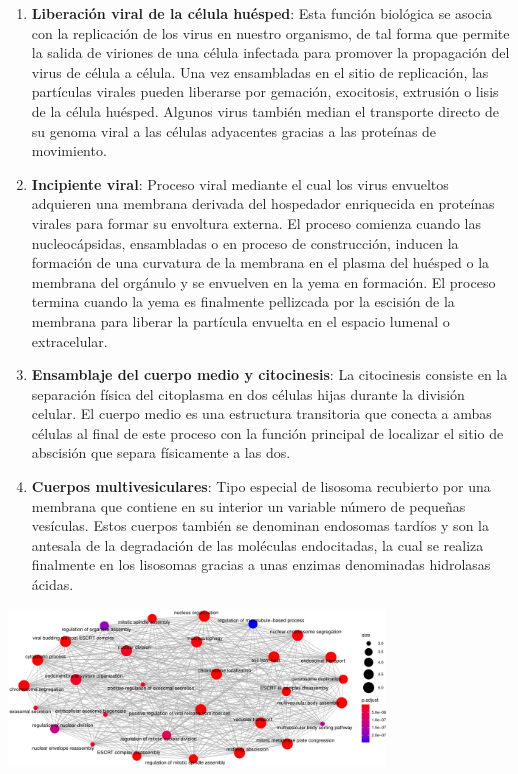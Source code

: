 \begin{enumerate}
    \item \textbf{Liberación viral de la célula huésped}: Esta función biológica se asocia con la replicación de los virus en nuestro organismo, de tal forma que permite la salida de viriones de una célula infectada para promover la propagación del virus de célula a célula. Una vez ensambladas en el sitio de replicación, las partículas virales pueden liberarse por gemación, exocitosis, extrusión o lisis de la célula huésped. Algunos virus también median el transporte directo de su genoma viral a las células adyacentes gracias a las proteínas de movimiento. 
    \item \textbf{Incipiente viral}: Proceso viral mediante el cual los virus envueltos adquieren una membrana derivada del hospedador enriquecida en proteínas virales para formar su envoltura externa. El proceso comienza cuando las nucleocápsidas, ensambladas o en proceso de construcción, inducen la formación de una curvatura de la membrana en el plasma del huésped o la membrana del orgánulo y se envuelven en la yema en formación. El proceso termina cuando la yema es finalmente pellizcada por la escisión de la membrana para liberar la partícula envuelta en el espacio lumenal o extracelular.
    \item \textbf{Ensamblaje del cuerpo medio y citocinesis}: La citocinesis consiste en la separación física del citoplasma en dos células hijas durante la división celular. El cuerpo medio es una estructura transitoria que conecta a ambas células al final de este proceso con la función principal de localizar el sitio de abscisión que separa físicamente a las dos. 
    \item \textbf{Cuerpos multivesiculares}: Tipo especial de lisosoma recubierto por una membrana que contiene en su interior un variable número de pequeñas vesículas. Estos cuerpos también se denominan endosomas tardíos y son la antesala de la degradación de las moléculas endocitadas, la cual se realiza finalmente en los lisosomas gracias a unas enzimas denominadas hidrolasas ácidas.
\end{enumerate}

\begin{center}
\includegraphics[width=100mm,scale=1]{report/figures/enrichGO_enrichmap-BP-58.pdf}
\end{center}


